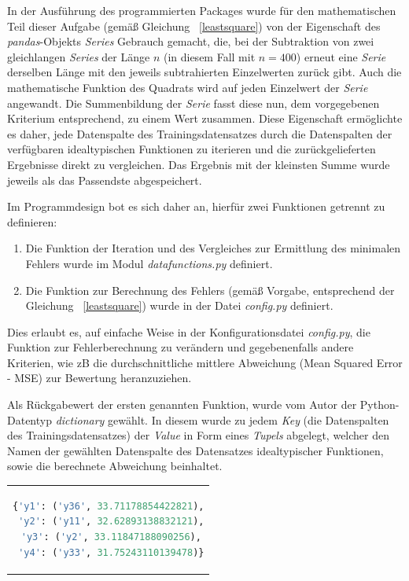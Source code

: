 In der Ausführung des programmierten Packages wurde für den mathematischen Teil dieser Aufgabe (gemäß Gleichung ~\ref{leastsquare})  von der Eigenschaft des \emph{pandas}-Objekts \emph{Series} Gebrauch gemacht, die, bei der Subtraktion von zwei gleichlangen \emph{Series} der Länge $n$ (in diesem Fall mit $n=400$) erneut eine \emph{Serie} derselben Länge mit den jeweils subtrahierten Einzelwerten zurück gibt. Auch die mathematische Funktion des Quadrats wird auf jeden Einzelwert der \emph{Serie} angewandt. Die Summenbildung der \emph{Serie} fasst diese nun, dem vorgegebenen Kriterium entsprechend, zu einem Wert zusammen.
Diese Eigenschaft ermöglichte es daher, jede Datenspalte des Trainingsdatensatzes durch die Datenspalten der verfügbaren idealtypischen Funktionen zu iterieren und die zurückgelieferten Ergebnisse direkt zu vergleichen. Das Ergebnis mit der kleinsten Summe wurde jeweils als das Passendste abgespeichert.

Im Programmdesign bot es sich daher an, hierfür zwei Funktionen getrennt zu definieren:
\begin{enumerate}
 \itemsep0pt
 \item Die Funktion der Iteration und des Vergleiches zur Ermittlung des minimalen Fehlers wurde im Modul \emph{datafunctions.py} definiert.
 \item Die Funktion zur Berechnung des Fehlers (gemäß Vorgabe, entsprechend der Gleichung ~\ref{leastsquare}) wurde in der Datei \emph{config.py} definiert.
\end{enumerate}

Dies erlaubt es, auf einfache Weise in der Konfigurationsdatei \emph{config.py}, die Funktion zur Fehlerberechnung zu verändern und gegebenenfalls andere Kriterien, wie zB die durchschnittliche mittlere Abweichung (Mean Squared Error - MSE) zur Bewertung heranzuziehen. 

Als Rückgabewert der ersten genannten Funktion, wurde vom Autor der Python-Datentyp \emph{dictionary} gewählt. In diesem wurde zu jedem \emph{Key} (die Datenspalten des Trainingsdatensatzes) der \emph{Value} in Form eines \emph{Tupels} abgelegt, welcher den Namen der gewählten Datenspalte des Datensatzes idealtypischer Funktionen, sowie die berechnete Abweichung beinhaltet.

\begin{tabular}{c}  %
\begin{lstlisting}[language=python,
				   title={Darstellung des Rückgabewertes der berechneten Übereinstimmungen},
				   label=dictresult]
{'y1': ('y36', 33.71178854422821),
 'y2': ('y11', 32.62893138832121),
 'y3': ('y2', 33.11847188090256),
 'y4': ('y33', 31.75243110139478)}
\end{lstlisting}
\end{tabular}

